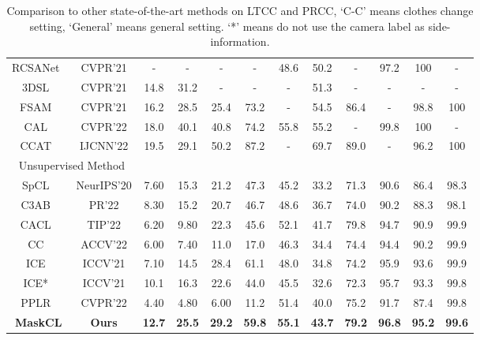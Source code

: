 \documentclass[10pt,twocolumn,letterpaper]{article}
\begin{document}
\begin{table*}[!htb]
\begin{center}
{\begin{tabular}{cccccccccccc}
RCSANet~\cite{huang:RCSANetCVPR21} & CVPR'21 & - & - & - & - & 48.6 & 50.2 & - & 97.2 & 100 & -  \\
3DSL~\cite{chen:3DSLCVPR21} & CVPR'21 & 14.8 & 31.2 & - & - & - & 51.3 &-  & - & - & -\\
FSAM~\cite{hong:FSAMCVPR21} & CVPR'21 & 16.2 & 28.5 & 25.4 & 73.2 & - & 54.5 & 86.4 & -  & 98.8 & 100\\
CAL~\cite{CCgu:CVPR22} & CVPR'22 & 18.0 & 40.1 & 40.8 & 74.2 & 55.8 & 55.2 & - & 99.8 & 100 & -  \\ 
CCAT~\cite{ren:CCATIJCNN22} & IJCNN'22 & 19.5 & 29.1 & 50.2 & 87.2 & - &69.7 & 89.0 & - & 96.2 & 100\\ 
\hline
\multicolumn{2}{c}{Unsupervised Method} \\
\hline
SpCL~\cite{Ge:NIPS20} & NeurIPS'20 & 7.60 & 15.3  & 21.2 & 47.3 & 45.2 & 33.2 & 71.3 & 90.6 & 86.4 & 98.3 \\
C3AB~\cite{lmkpr} & PR'22 & 8.30 & 15.2 & 20.7 & 46.7 & 48.6 & 36.7 & 74.0 & 90.2 & 88.3 & 98.1 \\
CACL~\cite{TIPlmk} & TIP'22 & 6.20 & 9.80 & 22.3 & 45.6 & 52.1 & 41.7 & 79.8 & 94.7 & 90.9 & 99.9\\
CC~\cite{dai:ACCV22} & ACCV'22 & 6.00 & 7.40 & 11.0 & 17.0 & 46.3 & 34.4 & 74.4  & 94.4 & 90.2 & 99.9 \\
ICE~\cite{chen:ICCV21} & ICCV'21 & 7.10 & 14.5 & 28.4 & 61.1 & 48.0 & 34.8 & 74.2 & 95.9 & 93.6 & 99.9 \\
ICE*~\cite{chen:ICCV21} & ICCV'21 & 10.1 & 16.3  & 22.6 & 44.0 & 45.5 & 32.6 & 72.3 &95.7 & 93.3  & 99.8    \\
PPLR~\cite{cho:CVPR22} & CVPR'22 & 4.40 & 4.80 & 6.00 & 11.2  & 51.4 & 40.0 & 75.2  & 91.7 & 87.4 & 99.8  \\
\hline
\bf{MaskCL} & \bf{Ours}  & \bf{12.7} & \bf{25.5} & \bf{29.2} & \bf{59.8} &  \bf{55.1} & \bf{43.7} & \bf{79.2}  &  \bf{96.8} & \bf{95.2} & \bf{99.6}   \\
\hline
\end{tabular}
}
\end{center}
\vspace{-5pt}
\caption{Comparison to other state-of-the-art methods on LTCC and PRCC, `C-C' means clothes change setting, `General' means general setting. 
{ `*'  means do not use the camera label as side-information.
}}
\label{tab:SOTALTCC}
\vspace{-15pt}
\end{table*}
\end{document}
